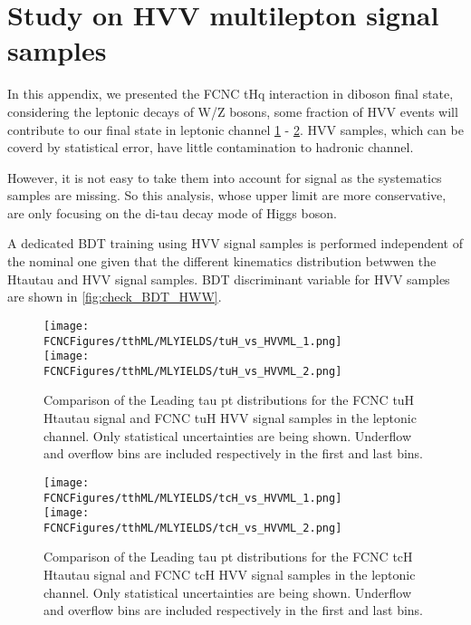 \section{Study on HVV multilepton signal samples}
\label{sec:HVVML}

In this appendix, we presented the FCNC tHq interaction in diboson final state, considering the leptonic decays of W/Z bosons, some fraction of HVV events will contribute to our final state in leptonic channel \ref{fig:check_tuH_HWW} - \ref{fig:check_tcH_HWW}. HVV samples, which can be coverd by statistical error, have little contamination to hadronic channel. 

However, it is not easy to take them into account for signal as the systematics samples are missing. So this analysis, whose upper limit are more conservative, are only focusing on the di-tau decay mode of Higgs boson.

A dedicated BDT training using HVV signal samples is performed independent of the nominal one given that the different kinematics distribution betwwen the Htautau and HVV signal samples. BDT discriminant variable for HVV samples are shown in \ref{fig:check_BDT_HWW}.


\begin{figure}[htb]
\centering
\texttt{[image: \\FCNCFigures/tthML/MLYIELDS/tuH\_vs\_HVVML\_1.png]}
\\
\texttt{[image: \\FCNCFigures/tthML/MLYIELDS/tuH\_vs\_HVVML\_2.png]}
\\
\caption{ Comparison of the Leading tau pt distributions for the FCNC tuH Htautau signal and FCNC tuH HVV signal samples in the leptonic channel. Only statistical uncertainties are being shown. Underflow and overflow bins are included respectively in the first and last bins.}
\label{fig:check_tuH_HWW}
\end{figure}


\begin{figure}[htb]
\centering
\texttt{[image: \\FCNCFigures/tthML/MLYIELDS/tcH\_vs\_HVVML\_1.png]}
\\
\texttt{[image: \\FCNCFigures/tthML/MLYIELDS/tcH\_vs\_HVVML\_2.png]}
\\
\caption{ Comparison of the Leading tau pt distributions for the FCNC tcH Htautau signal and FCNC tcH HVV signal samples in the leptonic channel. Only statistical uncertainties are being shown. Underflow and overflow bins are included respectively in the first and last bins.}
\label{fig:check_tcH_HWW}
\end{figure}






